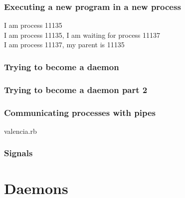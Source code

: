 \documentclass{beamer}
\begin{document}
\begin{frame}
  \frametitle{Executing a new program in a new process}

  

  \pause
  I am process 11135 \\
  I am process 11135, I am waiting for process 11137 \\
  I am process 11137, my parent is 11135
\end{frame}


\begin{frame}
  \frametitle{Trying to become a daemon}

  
\end{frame}

\begin{frame}
  \frametitle{Trying to become a daemon part 2}

  
\end{frame}


\begin{frame}
  \frametitle{Communicating processes with pipes}

  

  \pause
  valencia.rb
\end{frame}


\begin{frame}
  \frametitle{Signals}

  

  \pause
  
\end{frame}


\section{Daemons}
\end{document}
